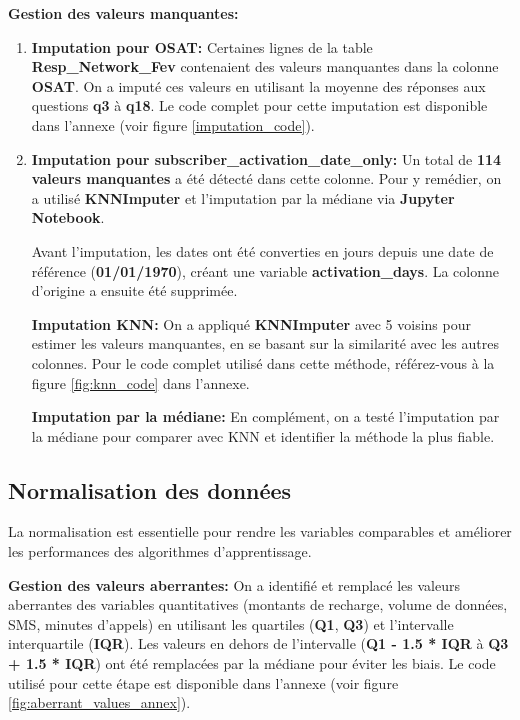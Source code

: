 \textbf{\checkmark Gestion des valeurs manquantes:}
\begin{enumerate}
    \item \textbf{Imputation pour OSAT:} Certaines lignes de la table \textbf{Resp\_Network\_Fev} contenaient des valeurs manquantes dans la colonne \textbf{OSAT}. On a imputé ces valeurs en utilisant la moyenne des réponses aux questions \textbf{q3} à \textbf{q18}. Le code complet pour cette imputation est disponible dans l'annexe (voir figure \ref{imputation_code}).

    \item \textbf{Imputation pour subscriber\_activation\_date\_only:} Un total de \textbf{114 valeurs manquantes} a été détecté dans cette colonne. Pour y remédier, on a utilisé \textbf{KNNImputer} et l'imputation par la médiane via \textbf{Jupyter Notebook}. 

    Avant l'imputation, les dates ont été converties en jours depuis une date de référence (\textbf{01/01/1970}), créant une variable \textbf{activation\_days}. La colonne d'origine a ensuite été supprimée.

    \textbf{Imputation KNN:} On a appliqué \textbf{KNNImputer} avec 5 voisins pour estimer les valeurs manquantes, en se basant sur la similarité avec les autres colonnes. Pour le code complet utilisé dans cette méthode, référez-vous à la figure \ref{fig:knn_code} dans l'annexe.

    \textbf{Imputation par la médiane:} En complément, on a testé l'imputation par la médiane pour comparer avec KNN et identifier la méthode la plus fiable.

\end{enumerate}

\subsection{Normalisation des données}

La normalisation est essentielle pour rendre les variables comparables et améliorer les performances des algorithmes d'apprentissage.

\textbf{\checkmark Gestion des valeurs aberrantes:}  
On a identifié et remplacé les valeurs aberrantes des variables quantitatives (montants de recharge, volume de données, SMS, minutes d'appels) en utilisant les quartiles (\textbf{Q1}, \textbf{Q3}) et l'intervalle interquartile (\textbf{IQR}). Les valeurs en dehors de l'intervalle (\textbf{Q1 - 1.5 * IQR} à \textbf{Q3 + 1.5 * IQR}) ont été remplacées par la médiane pour éviter les biais. Le code utilisé pour cette étape est disponible dans l'annexe (voir figure \ref{fig:aberrant_values_annex}).

